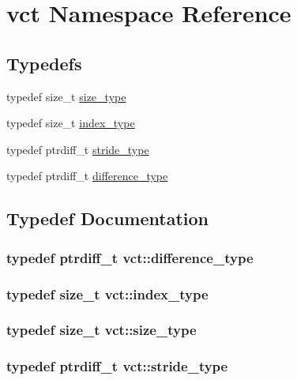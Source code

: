 \hypertarget{namespacevct}{}\section{vct Namespace Reference}
\label{namespacevct}
\subsection*{Typedefs}
\begin{DoxyCompactItemize}
\item 
typedef size\+\_\+t \hyperlink{namespacevct_a3e2935e13aac4500965e00d30565775b}{size\+\_\+type}
\item 
typedef size\+\_\+t \hyperlink{namespacevct_a50405d87494dce1f22ee3930ca285ee9}{index\+\_\+type}
\item 
typedef ptrdiff\+\_\+t \hyperlink{namespacevct_ababd20afe3b060aa77ea229b0226c154}{stride\+\_\+type}
\item 
typedef ptrdiff\+\_\+t \hyperlink{namespacevct_a1c68f426f63d011adc3563911c76550c}{difference\+\_\+type}
\end{DoxyCompactItemize}


\subsection{Typedef Documentation}
\hypertarget{namespacevct_a1c68f426f63d011adc3563911c76550c}{}
\subsubsection[{difference\+\_\+type}]{\setlength{\rightskip}{0pt plus 5cm}typedef ptrdiff\+\_\+t {\bf vct\+::difference\+\_\+type}}\label{namespacevct_a1c68f426f63d011adc3563911c76550c}
\hypertarget{namespacevct_a50405d87494dce1f22ee3930ca285ee9}{}
\subsubsection[{index\+\_\+type}]{\setlength{\rightskip}{0pt plus 5cm}typedef size\+\_\+t {\bf vct\+::index\+\_\+type}}\label{namespacevct_a50405d87494dce1f22ee3930ca285ee9}
\hypertarget{namespacevct_a3e2935e13aac4500965e00d30565775b}{}
\subsubsection[{size\+\_\+type}]{\setlength{\rightskip}{0pt plus 5cm}typedef size\+\_\+t {\bf vct\+::size\+\_\+type}}\label{namespacevct_a3e2935e13aac4500965e00d30565775b}
\hypertarget{namespacevct_ababd20afe3b060aa77ea229b0226c154}{}
\subsubsection[{stride\+\_\+type}]{\setlength{\rightskip}{0pt plus 5cm}typedef ptrdiff\+\_\+t {\bf vct\+::stride\+\_\+type}}\label{namespacevct_ababd20afe3b060aa77ea229b0226c154}
